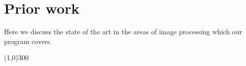 \section{Prior work}
\label{sec:prior}

Here we discuss the state of the art in the areas of image processing which our program covers.






\begin{center}
\line(1,0){300}
\end{center}
